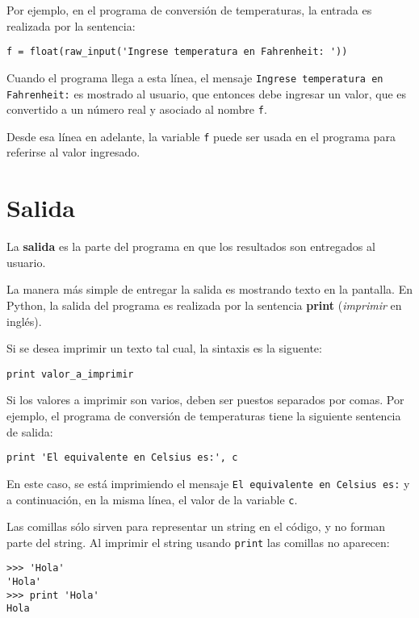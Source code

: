 Por ejemplo, en el programa de conversión de temperaturas, la entrada es
realizada por la sentencia:

\begin{lstlisting}
f = float(raw_input('Ingrese temperatura en Fahrenheit: '))
\end{lstlisting}

Cuando el programa llega a esta línea, el mensaje
\lstinline!Ingrese temperatura en Fahrenheit:! es mostrado al usuario,
que entonces debe ingresar un valor, que es convertido a un número real
y asociado al nombre \lstinline!f!.

Desde esa línea en adelante, la variable \lstinline!f! puede ser usada
en el programa para referirse al valor ingresado.

\section{Salida}

La \textbf{salida} es la parte del programa en que los resultados son
entregados al usuario.

La manera más simple de entregar la salida es mostrando texto en la
pantalla. En Python, la salida del programa es realizada por la
sentencia \textbf{print} (\emph{imprimir} en inglés).

Si se desea imprimir un texto tal cual, la sintaxis es la siguente:

\begin{lstlisting}
print valor_a_imprimir
\end{lstlisting}

Si los valores a imprimir son varios, deben ser puestos separados por
comas. Por ejemplo, el programa de conversión de temperaturas tiene la
siguiente sentencia de salida:

\begin{lstlisting}
print 'El equivalente en Celsius es:', c
\end{lstlisting}

En este caso, se está imprimiendo el mensaje
\texttt{El equivalente en Celsius es:} y a continuación, en la misma
línea, el valor de la variable \lstinline!c!.

Las comillas sólo sirven para representar un string en el código, y no
forman parte del string. Al imprimir el string usando \lstinline!print!
las comillas no aparecen:

\begin{lstlisting}
>>> 'Hola'
'Hola'
>>> print 'Hola'
Hola
\end{lstlisting}

